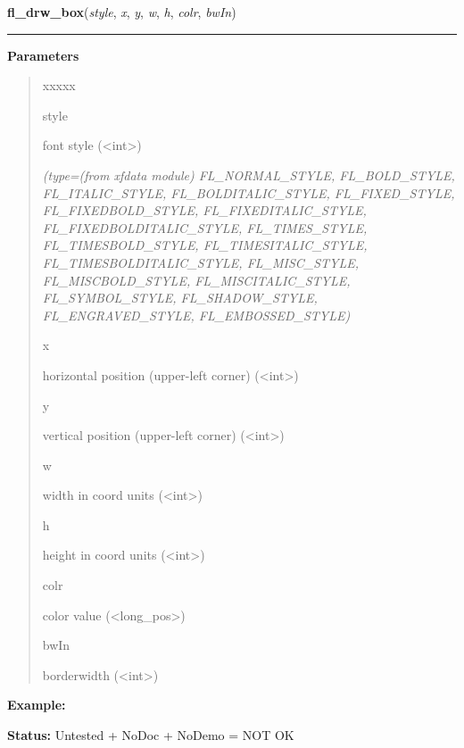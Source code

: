 \hspace{.8\funcindent}\begin{boxedminipage}{\funcwidth}

    \raggedright \textbf{fl\_drw\_box}(\textit{style}, \textit{x}, \textit{y}, \textit{w}, \textit{h}, \textit{colr}, \textit{bwIn})

    \vspace{-1.5ex}

    \rule{\textwidth}{0.5\fboxrule}
\setlength{\parskip}{2ex}
\setlength{\parskip}{1ex}
      \textbf{Parameters}
      \vspace{-1ex}

      \begin{quote}
        \begin{Ventry}{xxxxx}

          \item[style]

          font style ({\textless}int{\textgreater})

            {\it (type=(from xfdata module) FL\_NORMAL\_STYLE, FL\_BOLD\_STYLE, FL\_ITALIC\_STYLE,
FL\_BOLDITALIC\_STYLE, FL\_FIXED\_STYLE, FL\_FIXEDBOLD\_STYLE, 
FL\_FIXEDITALIC\_STYLE, FL\_FIXEDBOLDITALIC\_STYLE, FL\_TIMES\_STYLE, 
FL\_TIMESBOLD\_STYLE, FL\_TIMESITALIC\_STYLE, FL\_TIMESBOLDITALIC\_STYLE, 
FL\_MISC\_STYLE, FL\_MISCBOLD\_STYLE, FL\_MISCITALIC\_STYLE, 
FL\_SYMBOL\_STYLE, FL\_SHADOW\_STYLE, FL\_ENGRAVED\_STYLE, 
FL\_EMBOSSED\_STYLE)}

          \item[x]

          horizontal position (upper-left corner) 
          ({\textless}int{\textgreater})

          \item[y]

          vertical position (upper-left corner) 
          ({\textless}int{\textgreater})

          \item[w]

          width in coord units ({\textless}int{\textgreater})

          \item[h]

          height in coord units ({\textless}int{\textgreater})

          \item[colr]

          color value ({\textless}long\_pos{\textgreater})

          \item[bwIn]

          borderwidth ({\textless}int{\textgreater})

        \end{Ventry}

      \end{quote}

\textbf{Example:} 

\textbf{Status:} Untested + NoDoc + NoDemo = NOT OK



    \end{boxedminipage}

